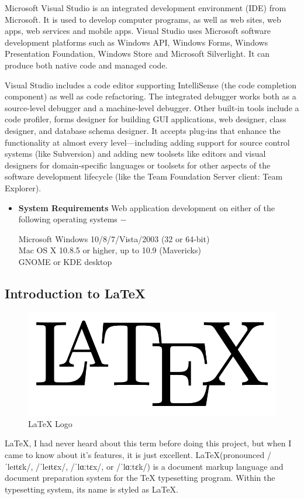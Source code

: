Microsoft Visual Studio is an integrated development environment (IDE) from Microsoft. It is used to develop computer programs, as well as web sites, web apps, web services and mobile apps. Visual Studio uses Microsoft software development platforms such as Windows API, Windows Forms, Windows Presentation Foundation, Windows Store and Microsoft Silverlight. It can produce both native code and managed code.

Visual Studio includes a code editor supporting IntelliSense (the code completion component) as well as code refactoring. The integrated debugger works both as a source-level debugger and a machine-level debugger. Other built-in tools include a code profiler, forms designer for building GUI applications, web designer, class designer, and database schema designer. It accepts plug-ins that enhance the functionality at almost every level—including adding support for source control systems (like Subversion) and adding new toolsets like editors and visual designers for domain-specific languages or toolsets for other aspects of the software development lifecycle (like the Team Foundation Server client: Team Explorer).





\begin{itemize}
\item \textbf{System Requirements}
Web application development on either of the following operating systems −
\vskip 0.1in

Microsoft Windows 10/8/7/Vista/2003 (32 or 64-bit)
\\Mac OS X 10.8.5 or higher, up to 10.9 (Mavericks)
\\GNOME or KDE desktop
\vskip 0.1in

\end{itemize}

\subsection{Introduction to \LaTeX}
\begin{figure}[ht]
\centering
\includegraphics[scale=0.2]{images/latex.png}
\caption{\LaTeX{} Logo}
\end{figure}
\hspace{-1.8em} \LaTeX{}, I had never heard about this term before doing this project,
but when I came to know about it's features, it is just excellent. 
\LaTeX (pronounced /ˈleɪtɛk/, /ˈleɪtɛx/, /ˈlɑːtɛx/, or /ˈlɑːtɛk/) is a 
document markup language and document preparation system for the \TeX{} 
typesetting  program. Within the typesetting system, its name is styled 
as \LaTeX.

